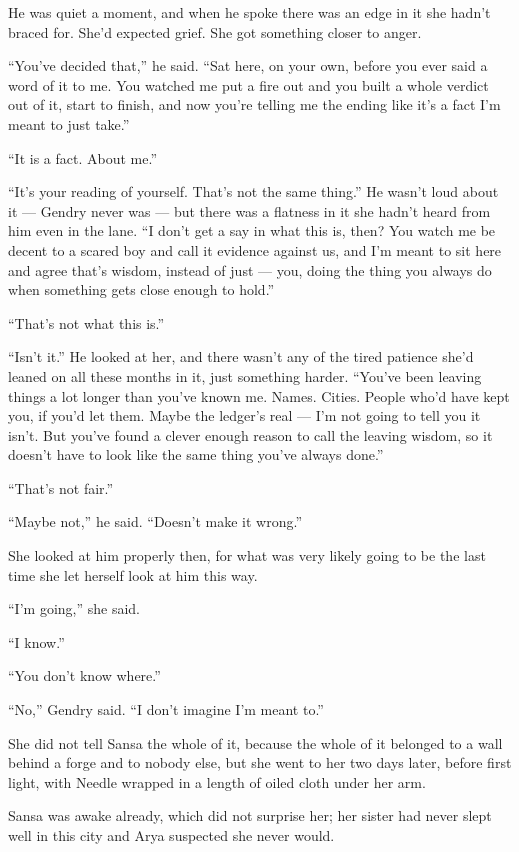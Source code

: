 He was quiet a moment, and when he spoke there was an edge in it she hadn’t braced for. She’d expected grief. She got something closer to anger.

“You’ve decided that,” he said. “Sat here, on your own, before you ever said a word of it to me. You watched me put a fire out and you built a whole verdict out of it, start to finish, and now you’re telling me the ending like it’s a fact I’m meant to just take.”

“It is a fact. About me.”

“It’s your reading of yourself. That’s not the same thing.” He wasn’t loud about it — Gendry never was — but there was a flatness in it she hadn’t heard from him even in the lane. “I don’t get a say in what this is, then? You watch me be decent to a scared boy and call it evidence against us, and I’m meant to sit here and agree that’s wisdom, instead of just — you, doing the thing you always do when something gets close enough to hold.”

“That’s not what this is.”

“Isn’t it.” He looked at her, and there wasn’t any of the tired patience she’d leaned on all these months in it, just something harder. “You’ve been leaving things a lot longer than you’ve known me. Names. Cities. People who’d have kept you, if you’d let them. Maybe the ledger’s real — I’m not going to tell you it isn’t. But you’ve found a clever enough reason to call the leaving wisdom, so it doesn’t have to look like the same thing you’ve always done.”

“That’s not fair.”

“Maybe not,” he said. “Doesn’t make it wrong.”

She looked at him properly then, for what was very likely going to be the last time she let herself look at him this way.

“I’m going,” she said.

“I know.”

“You don’t know where.”

“No,” Gendry said. “I don’t imagine I’m meant to.”

\sceneBreak

She did not tell Sansa the whole of it, because the whole of it belonged to a wall behind a forge and to nobody else, but she went to her two days later, before first light, with Needle wrapped in a length of oiled cloth under her arm.

Sansa was awake already, which did not surprise her; her sister had never slept well in this city and Arya suspected she never would.

